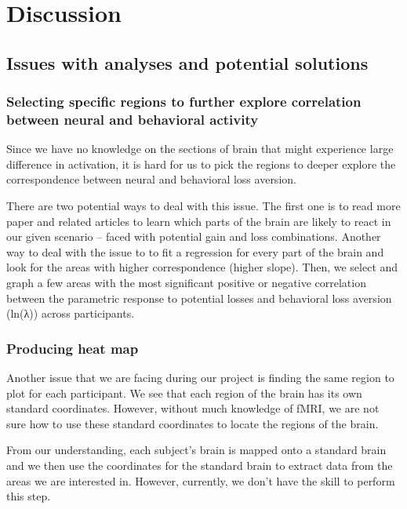 \section{Discussion}

\subsection{Issues with analyses and potential solutions}

\subsubsection{Selecting specific regions to further explore 
correlation between neural and behavioral activity}

\indent \indent Since we have no knowledge on the sections of brain that might 
experience large difference in activation, it is hard for us to pick the 
regions to deeper explore the correspondence between neural and behavioral loss 
aversion.

There are two potential ways to deal with this issue. The first one is to read 
more paper and related articles to learn which parts of the brain are likely to 
react in our given scenario -- faced with potential gain and loss combinations. 
Another way to deal with the issue to to fit a regression for every part of the 
brain and look for the areas with higher correspondence (higher slope). Then, 
we select and graph a few areas with the most significant positive or negative 
correlation between the parametric response to potential losses and behavioral 
loss aversion (ln(λ)) across participants.

\subsubsection{Producing heat map}

\indent \indent Another issue that we are facing during our project is finding 
the same region to plot for each participant. We see that each region of the 
brain has its own standard coordinates. However, without much knowledge of 
fMRI, we are not sure how to use these standard coordinates to locate the 
regions of the brain.

From our understanding, each subject's brain is mapped onto a standard brain 
and we then use the coordinates for the standard brain to extract data from 
the areas we are interested in. However, currently, we don't have the skill to 
perform this step.

